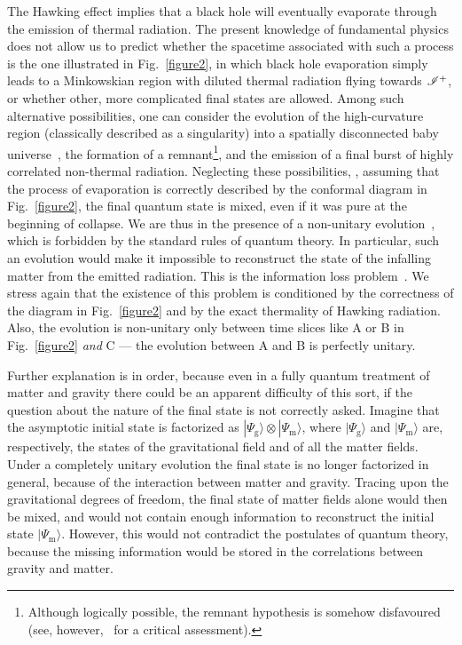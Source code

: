 \documentclass[12pt]{article}
\begin{document}
The Hawking effect implies that a black hole will eventually evaporate through the emission of thermal radiation.  The present knowledge of fundamental physics does not allow us to predict whether the spacetime associated with such a process is the one illustrated in Fig.~\ref{figure2}, in which black hole evaporation simply leads to a Minkowskian region with diluted thermal radiation flying towards $\mathscr{I}^+$, or whether other, more complicated final states are allowed.  Among such alternative possibilities, one can consider the evolution of the high-curvature region (classically described as a singularity) into a spatially disconnected baby universe~\cite{ted-valdivia}, the formation of a remnant\footnote{Although logically possible, the remnant hypothesis is somehow disfavoured~\cite{Giddings:1992hh, Giddings:1993km, Giddings:1993vj} (see, however,~\cite{Hossenfelder:2009xq} for a critical assessment).}, and the emission of a final burst of highly correlated non-thermal radiation.  Neglecting these possibilities, \ie, assuming that the process of evaporation is correctly described by the conformal diagram in Fig.~\ref{figure2}, the final quantum state is mixed, even if it was pure at the beginning of collapse.  We are thus in the presence of a  non-unitary evolution~\cite{Hawking:1976ra, Hawking:1982dj}, which is forbidden by the standard rules of quantum theory.   In particular, such an evolution would make it impossible to reconstruct the state of the infalling matter from the emitted radiation.  This is the information loss problem~\cite{Page:1993up, Giddings:1994zs}.  We stress again that the existence of this problem is conditioned by the correctness of the diagram in Fig.~\ref{figure2} and by the exact thermality of Hawking radiation.  Also, the evolution is non-unitary only between time slices like A or B in Fig.~\ref{figure2} {\em and\/} C --- the evolution between A and B is perfectly unitary.

Further explanation is in order, because even in a fully quantum treatment of matter and gravity there could be an apparent difficulty of this sort, if the question about the nature of the final state is not correctly asked.  Imagine that the asymptotic initial state is factorized as $|\Psi_\mathrm{g}\rangle\otimes |\Psi_\mathrm{m}\rangle$, where $|\Psi_\mathrm{g}\rangle$ and $|\Psi_\mathrm{m}\rangle$ are, respectively, the states of the gravitational field and of all the matter fields.  Under a completely unitary evolution the final state is no longer factorized in general, because of the interaction  between matter and gravity.  Tracing upon the gravitational degrees of freedom, the final state of matter fields alone would then be mixed, and would not contain enough information to reconstruct the initial state $|\Psi_\mathrm{m}\rangle$.  However, this would not contradict the postulates of quantum theory, because the missing information would be stored in the correlations between gravity and matter.
\end{document}
